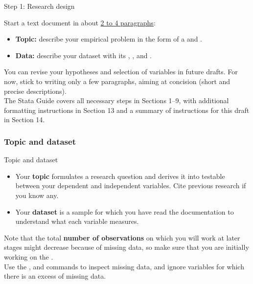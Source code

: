 \documentclass{beamer}
\begin{document}
	\begin{frame}[t]{Step 1: Research design}
	
	Start a text document in about \underline{2 to 4 paragraphs}:
	
	\begin{itemize}
		\item \textbf{Topic:} describe your empirical problem in the form of a  and .
		\item \textbf{Data:} describe your dataset with its , ,  and .
	\end{itemize}
	
	You can revise your hypotheses and selection of variables in future drafts. For now, stick to writing only a few paragraphs, aiming at concision (short and precise descriptions).\\[1em]
	
	The Stata Guide covers all necessary steps in Sections 1--9, with additional formatting instructions in Section 13 and a summary of instructions for this draft in Section 14.
	
	\end{frame}

	\subsubsection{Topic and dataset}
	
	\begin{frame}[t]{Topic and dataset}
		
	\begin{itemize}
		\item Your \textbf{topic} formulates a research question and derives it into testable  between your dependent and independent variables. Cite previous research if you know any.
		\item Your \textbf{dataset} is a  sample for which you have read the documentation to understand what each variable measures.
	\end{itemize}
	
	Note that the total \textbf{number of observations} on which you will work at later stages might decrease because of missing data, so make sure that you are initially working on the .\\[1em]
	
	Use the ,  and  commands to inspect missing data, and ignore variables for which there is an excess of missing data.
	
	\end{frame}
\end{document}
